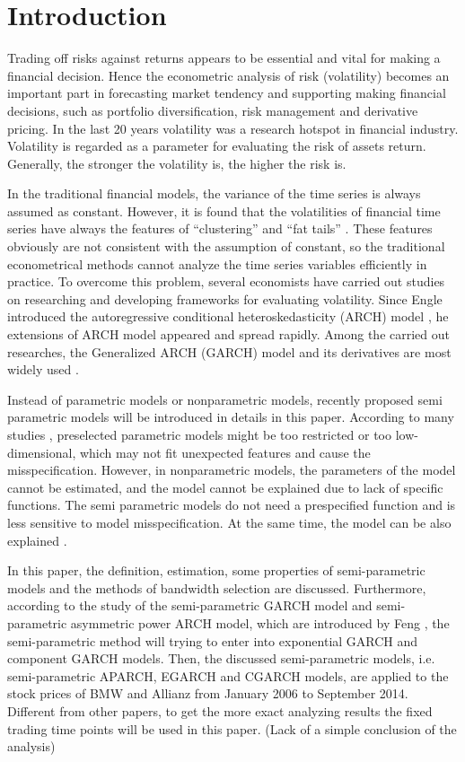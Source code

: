 \chapter{Introduction}\label{secIntroduction}
Trading off risks against returns appears to be essential and vital for making a financial decision. Hence the econometric analysis of risk (volatility) becomes an important part in forecasting market tendency and supporting making financial decisions, such as portfolio diversification, risk management and derivative pricing. In the last 20 years volatility was a research hotspot in financial industry. Volatility is regarded as a parameter for evaluating the risk of assets return. Generally, the stronger the volatility is, the higher the risk is.

In the traditional financial models, the variance of the time series is always assumed as constant. However, it is found that the volatilities of financial time series have always the features of “clustering” and “fat tails”  \citep{Mandelbrot1963,EugeneF.Fama1965}. These features obviously are not consistent with the assumption of constant, so the traditional econometrical methods cannot analyze the time series variables efficiently in practice. To overcome this problem, several economists have carried out studies on researching and developing frameworks for evaluating volatility. Since Engle introduced the autoregressive conditional heteroskedasticity (ARCH) model \citep{Engle1982}, he extensions of ARCH model appeared and spread rapidly. Among the carried out researches, the Generalized ARCH (GARCH) model and its derivatives are most widely used \citep{Bollerslev1986}.

Instead of parametric models or nonparametric models, recently proposed semi parametric models will be introduced in details in this paper. According to many studies \citep{Gourieroux1992,Eubank1993}, preselected parametric models might be too restricted or too low-dimensional, which may not fit unexpected features and cause the misspecification. However, in nonparametric models, the parameters of the model cannot be estimated, and the model cannot be explained due to lack of specific functions. The semi parametric models do not need a prespecified function and is less sensitive to model misspecification. At the same time, the model can be also explained \citep{Di2011}.

In this paper, the definition, estimation, some properties of semi-parametric models and the methods of bandwidth selection are discussed. Furthermore, according to the study of the semi-parametric GARCH model and semi-parametric asymmetric power ARCH model, which are introduced by Feng \citep{Feng2004} \citep{FengYuanhua;Sun2013}, the semi-parametric method will trying to enter into exponential GARCH and component GARCH models. Then, the discussed semi-parametric models, i.e. semi-parametric APARCH, EGARCH and CGARCH models, are applied to the stock prices of BMW and Allianz from January 2006 to September 2014. Different from other papers, to get the more exact analyzing results the fixed trading time points will be used in this paper. (Lack of a simple conclusion of the analysis)

